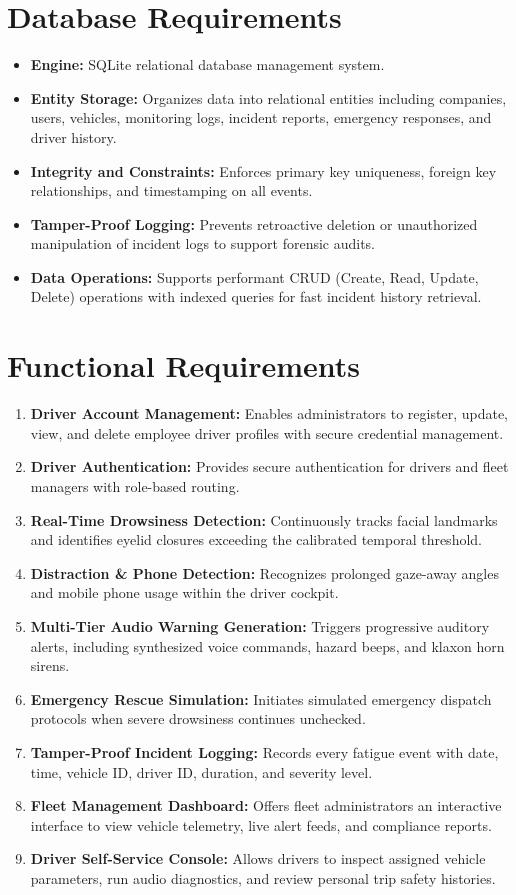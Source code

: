 \documentclass[a4paper,12pt]{report}
\begin{document}
\section{Database Requirements}
\begin{itemize}
    \item \textbf{Engine:} SQLite relational database management system.
    \item \textbf{Entity Storage:} Organizes data into relational entities including companies, users, vehicles, monitoring logs, incident reports, emergency responses, and driver history.
    \item \textbf{Integrity and Constraints:} Enforces primary key uniqueness, foreign key relationships, and timestamping on all events.
    \item \textbf{Tamper-Proof Logging:} Prevents retroactive deletion or unauthorized manipulation of incident logs to support forensic audits.
    \item \textbf{Data Operations:} Supports performant CRUD (Create, Read, Update, Delete) operations with indexed queries for fast incident history retrieval.
\end{itemize}

\section{Functional Requirements}
\begin{enumerate}
    \item \textbf{Driver Account Management:} Enables administrators to register, update, view, and delete employee driver profiles with secure credential management.
    \item \textbf{Driver Authentication:} Provides secure authentication for drivers and fleet managers with role-based routing.
    \item \textbf{Real-Time Drowsiness Detection:} Continuously tracks facial landmarks and identifies eyelid closures exceeding the calibrated temporal threshold.
    \item \textbf{Distraction \& Phone Detection:} Recognizes prolonged gaze-away angles and mobile phone usage within the driver cockpit.
    \item \textbf{Multi-Tier Audio Warning Generation:} Triggers progressive auditory alerts, including synthesized voice commands, hazard beeps, and klaxon horn sirens.
    \item \textbf{Emergency Rescue Simulation:} Initiates simulated emergency dispatch protocols when severe drowsiness continues unchecked.
    \item \textbf{Tamper-Proof Incident Logging:} Records every fatigue event with date, time, vehicle ID, driver ID, duration, and severity level.
    \item \textbf{Fleet Management Dashboard:} Offers fleet administrators an interactive interface to view vehicle telemetry, live alert feeds, and compliance reports.
    \item \textbf{Driver Self-Service Console:} Allows drivers to inspect assigned vehicle parameters, run audio diagnostics, and review personal trip safety histories.
\end{enumerate}
\end{document}
